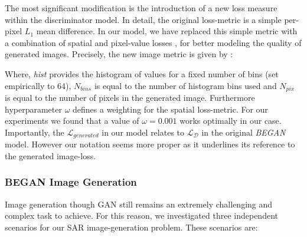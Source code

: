 \documentclass{article}
\begin{document}
\bigskip

\noindent
The most significant modification is the introduction of a 
new loss measure within the discriminator model. 
%
In detail, the original loss-metric is a simple per-pixel \emph{$L_1$} 
mean difference.
%
In our model, we have replaced this simple metric with a combination of spatial and 
pixel-value losses , for better modeling the quality of generated images.
%
Precisely, the new image metric is given by :

\bigskip

	
	\bigskip
	
	
	\bigskip
		

\bigskip

\noindent
Where, \emph{hist} provides the histogram of values for a fixed number 
of bins (set empirically to 64), $N_{bins}$ is equal to the number of histogram 
bins used and $N_{pix}$ is equal to the number of pixels in the generated image. 
%
Furthermore hyperparameter $\omega$ defines a weighting for the spatial loss-metric. For our
experiments we found that a value of $\omega=0.001$ works optimally in our case.
%
Importantly, the $\mathcal{L}_{generated}$ in our model relates to $\mathcal{L_D}$ in
the original \emph{BEGAN} model. However our notation seems more proper as it underlines
its reference to the generated image-loss.
 
 
\subsubsection{BEGAN Image Generation}

Image generation though GAN still remains an extremely challenging and complex task 
to achieve. For this reason, we investigated three independent scenarios for our 
SAR image-generation problem. These scenarios are:
\end{document}

